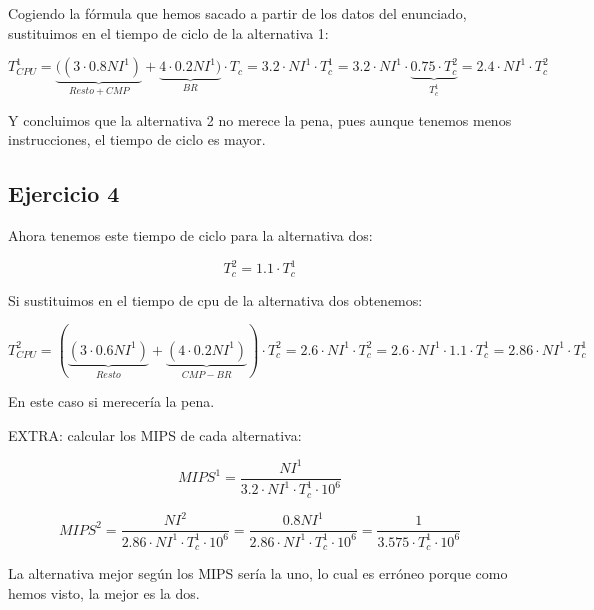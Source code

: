 \documentclass[10pt,a4paper,spanish]{report}
\begin{document}
Cogiendo la fórmula que hemos sacado a partir de los datos del enunciado, sustituimos en el tiempo de ciclo de la alternativa 1:

\begin{displaymath}
T_{CPU}^1 = \underbrace{((3 \cdot 0.8NI^1)}_{Resto+CMP} + \underbrace{4 \cdot 0.2NI^1)}_{BR} \cdot T_c = 3.2 \cdot NI^1 \cdot T_c^1 = 3.2 \cdot NI^1 \cdot \underbrace{0.75 \cdot T_c^2}_{T_c^1} = 2.4 \cdot NI^1 \cdot T_c^2
\end{displaymath}

Y concluimos que la alternativa 2 no merece la pena, pues aunque tenemos menos instrucciones, el tiempo de ciclo es mayor.

\textcolor[rgb]{0.2,0.4,0.8}{\subsection{Ejercicio 4}}

Ahora tenemos este tiempo de ciclo para la alternativa dos:

\begin{displaymath}
T_c^2 = 1.1 \cdot T_c^1
\end{displaymath}

Si sustituimos en el tiempo de cpu de la alternativa dos obtenemos:

\begin{displaymath}
T_{CPU}^2 = (\underbrace{(3 \cdot 0.6NI^1)}_{Resto} + \underbrace{(4 \cdot 0.2NI^1)}_{CMP-BR}) \cdot T_c^2 = 2.6 \cdot NI^1 \cdot T_c^2 = 2.6 \cdot NI^1 \cdot 1.1 \cdot T_c^1 = 2.86 \cdot NI^1 \cdot T_c^1
\end{displaymath}

En este caso si merecería la pena.

EXTRA: calcular los MIPS de cada alternativa:

\begin{displaymath}
MIPS^1 = \frac{NI^1}{3.2\cdot NI^1 \cdot T_c^1 \cdot 10^6}
\end{displaymath}

\begin{displaymath}
MIPS^2 = \frac{NI^2}{2.86 \cdot NI^1 \cdot T_c^1 \cdot 10^6} = \frac{0.8NI^1}{2.86 \cdot NI^1 \cdot T_c^1 \cdot 10^6} = \frac{1}{3.575 \cdot T_c^1 \cdot 10^6}
\end{displaymath}


La alternativa mejor según los MIPS sería la uno, lo cual es erróneo porque como hemos visto, la mejor es la dos.
\end{document}
